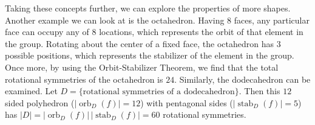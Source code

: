 \documentclass[11pt,twoside]{article}
\begin{document}
Taking these concepts further, we can explore the properties of more shapes.  Another example we can look at is the octahedron.  Having $8$ faces, any particular face can occupy any of $8$ locations, which represents the orbit of that element in the group.  Rotating about the center of a fixed face, the octahedron has $3$ possible positions, which represents the stabilizer of the element in the group.  Once more, by using the Orbit-Stabilizer Theorem, we find that the total rotational symmetries of the octahedron is $24$.  Similarly, the dodecahedron can be examined.  Let $D = \{ \text{rotational symmetries of a dodecahedron} \}$.  Then this $12$ sided polyhedron ($|\operatorname{orb}_{D}(f)| = 12$) with pentagonal sides ($|\operatorname{stab}_{D}(f)| = 5$) has $|D| = |\operatorname{orb}_{D}(f)|\,|\operatorname{stab}_{D}(f)| = 60$ rotational symmetries.
\end{document}
